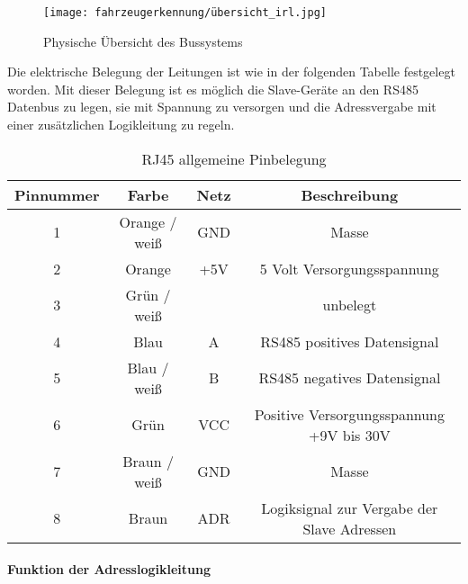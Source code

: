 \begin{figure}[H]
    \centering
    \texttt{[image: fahrzeugerkennung/übersicht\_irl.jpg]}
    \caption{Physische Übersicht des Bussystems}
\end{figure}

Die elektrische Belegung der Leitungen ist wie in der folgenden Tabelle festgelegt worden. Mit dieser Belegung ist es möglich die Slave-Geräte an den RS485 Datenbus zu legen,
sie mit Spannung zu versorgen und die Adressvergabe mit einer zusätzlichen Logikleitung zu regeln. 

\begin{table}[]
    \centering
    \begin{tabular}{|c|c|c|c|}
        \hline
        \textbf{Pinnummer} & \textbf{Farbe} & \textbf{Netz} & \textbf{Beschreibung}                      \\ \hline
        1                  & Orange / weiß  & GND           & Masse                                      \\ \hline
        2                  & Orange         & +5V           & 5 Volt Versorgungsspannung                 \\ \hline
        3                  & Grün / weiß    &               & unbelegt                                   \\ \hline
        4                  & Blau           & A             & RS485 positives Datensignal                \\ \hline
        5                  & Blau / weiß    & B             & RS485 negatives Datensignal                \\ \hline
        6                  & Grün           & VCC           & Positive Versorgungsspannung +9V bis 30V   \\ \hline
        7                  & Braun / weiß   & GND           & Masse                                      \\ \hline
        8                  & Braun          & ADR           & Logiksignal zur Vergabe der Slave Adressen \\ \hline
    \end{tabular}
    \caption{RJ45 allgemeine Pinbelegung}
\end{table}

\paragraph{Funktion der Adresslogikleitung}\mbox{}\\

